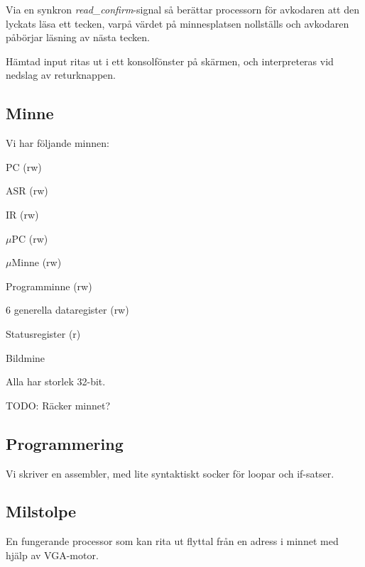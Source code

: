 \documentclass[]{article}
\begin{document}
Via en synkron \textit{read\_confirm}-signal så berättar processorn för avkodaren att den lyckats läsa ett tecken, varpå värdet på minnesplatsen nollställs och avkodaren påbörjar läsning av nästa tecken.

Hämtad input ritas ut i ett konsolfönster på skärmen, och interpreteras vid nedslag av returknappen.

\subsection{Minne}
Vi har följande minnen:
\begin{itemize*}
\item PC (rw)
\item ASR (rw)
\item IR (rw)
\item $\mu$PC (rw)
\item $\mu$Minne (rw)
\item Programminne (rw)
\item 6 generella dataregister (rw)
\item Statusregister (r)
\item Bildmine
\end{itemize*}
Alla har storlek 32-bit.

TODO: Räcker minnet?

\subsection{Programmering}
Vi skriver en assembler, med lite syntaktiskt socker för loopar och if-satser.

\subsection{Milstolpe}
En fungerande processor som kan rita ut flyttal från en adress i minnet med hjälp av VGA-motor.
\end{document}
